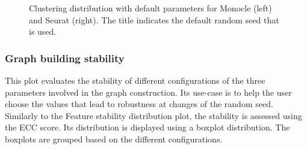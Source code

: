 \begin{figure}[H]
    \centering
    \caption{\label{fig:ca-nn-k}Clustering distribution with default parameters for Monocle (left) and Seurat (right). The title indicates the default random seed that is used.}
\end{figure}

\subsubsection{Graph building stability}
This plot evaluates the stability of different configurations of the three parameters involved in the graph construction. Its use-case is to help the user choose the values that lead to robustness at changes of the random seed. Similarly to the Feature stability distribution plot, the stability is assessed using the ECC score. Its distribution is displayed using a boxplot distribution. The boxplots are grouped based on the different configurations.

